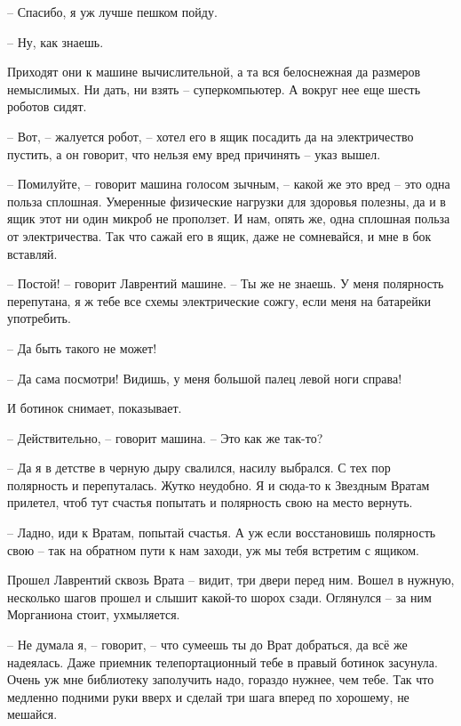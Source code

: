 \documentclass[ebook,oneside,final,openright]{memoir}
\begin{document}
– Спасибо, я уж лучше пешком пойду. \par
– Ну, как знаешь. \par
\par
Приходят они к машине вычислительной, а та вся белоснежная да размеров немыслимых. Ни дать, ни взять – суперкомпьютер. А вокруг нее еще шесть роботов сидят. \par
– Вот, – жалуется робот, – хотел его в ящик посадить да на электричество пустить, а он говорит, что нельзя ему вред причинять – указ вышел. \par
– Помилуйте, – говорит машина голосом зычным, – какой же это вред – это одна польза сплошная. Умеренные физические нагрузки для здоровья полезны, да и в ящик этот ни один микроб не проползет. И нам, опять же, одна сплошная польза от электричества. Так что сажай его в ящик, даже не сомневайся, и мне в бок вставляй. \par
– Постой! – говорит Лаврентий машине. – Ты же не знаешь. У меня полярность перепутана, я ж тебе все схемы электрические сожгу, если меня на батарейки употребить. \par
– Да быть такого не может! \par
– Да сама посмотри! Видишь, у меня большой палец левой ноги справа! \par
И ботинок снимает, показывает. \par
– Действительно, – говорит машина. – Это как же так-то? \par
– Да я в детстве в черную дыру свалился, насилу выбрался. С тех пор полярность и перепуталась. Жутко неудобно. Я и сюда-то к Звездным Вратам прилетел, чтоб тут счастья попытать и полярность свою на место вернуть. \par
– Ладно, иди к Вратам, попытай счастья. А уж если восстановишь полярность свою – так на обратном пути к нам заходи, уж мы тебя встретим с ящиком.\par
\par
Прошел Лаврентий сквозь Врата – видит, три двери перед ним. Вошел в нужную, несколько шагов прошел и слышит какой-то шорох сзади. Оглянулся – за ним Морганиона стоит, ухмыляется. \par
\par
– Не думала я, – говорит, – что сумеешь ты до Врат добраться, да всё же надеялась. Даже приемник телепортационный тебе в правый ботинок засунула. Очень уж мне библиотеку заполучить надо, гораздо нужнее, чем тебе. Так что медленно подними руки вверх и сделай три шага вперед по хорошему, не мешайся.\par
\end{document}
